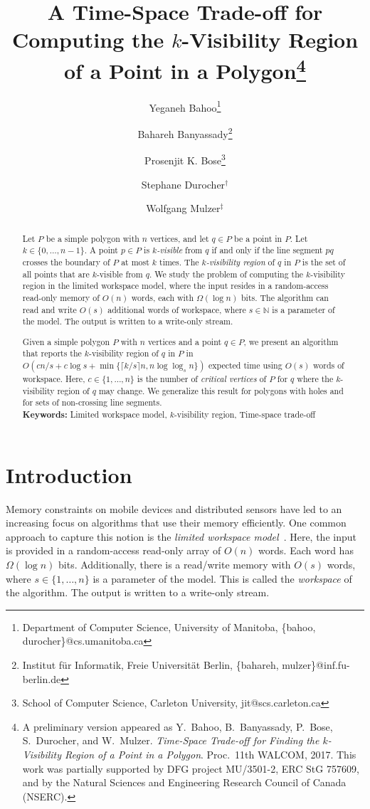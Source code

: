 \documentclass[11pt, a4paper]{article}
\title{A Time-Space Trade-off for Computing the $k$-Visibility 
Region of a Point in a Polygon\footnote{
A preliminary version appeared as 
Y.~Bahoo, B.~Banyassady, P.~Bose, S.~Durocher, and 
W.~Mulzer. \emph{Time-Space Trade-off for Finding 
the $k$-Visibility Region of a Point in a Polygon}. Proc.~11th WALCOM, 
2017.  This work was partially 
supported by DFG project MU/3501-2, ERC StG 757609, and by the 
Natural Sciences and Engineering Research Council of Canada (NSERC).}}
\author{Yeganeh Bahoo\thanks{Department of Computer Science,
        University of Manitoba, \{bahoo, durocher\}@cs.umanitoba.ca}
        \and
        Bahareh Banyassady\thanks{Institut f\"ur Informatik, Freie 
	Universit\"at Berlin,
        {\{bahareh, mulzer\}@inf.fu-berlin.de}}
        \and
        Prosenjit K. Bose\thanks{School of Computer Science,
        Carleton University, {jit@scs.carleton.ca}}
        \and 
        Stephane Durocher$^\dagger$
        \and 
        Wolfgang Mulzer$^\ddagger$
        }
\date{}
\newcommand{\N}{\mathbb{N}}
\begin{document}
\maketitle

\begin{abstract}
Let $P$ be a simple polygon with $n$ vertices, and let 
$q \in P$ be a point in $P$. Let $k \in \{0, \dots, n - 1\}$. 
A point $p \in P$ is \emph{$k$-visible} from $q$ 
if and only if the line segment $pq$ crosses the 
boundary of $P$ at most $k$ times. The \emph{$k$-visibility 
region} of $q$ in $P$ is the set of all points that 
are $k$-visible from $q$.  We study the problem of 
computing the $k$-visibility region in the 
limited workspace model, where the input resides 
in a random-access read-only memory of $O(n)$ words, 
each with $\Omega(\log{n})$ bits. The algorithm can read 
and write $O(s)$ additional words of workspace, 
where $s \in \N$ is a parameter of the model. The 
output is written to a write-only stream. 

Given a simple polygon $P$ with $n$ vertices and 
a point $q \in P$, we present an
algorithm that reports the $k$-visibility region 
of $q$ in $P$ in $O(cn/s+c\log{s} + 
\min\{\lceil k/s \rceil n,n \log{\log_s{n}}\})$ 
expected time using $O(s)$ words of workspace. 
Here, $c \in \{1, \dots, n\}$ is the number of 
\emph{critical vertices} of $P$ for $q$ where the 
$k$-visibility region of $q$ may change. We 
generalize this result for polygons with holes 
and for sets of non-crossing line segments.\\
\linebreak\textbf{Keywords:} Limited workspace model, 
$k$-visibility region, 
Time-space trade-off
\end{abstract}

\section{Introduction}
Memory constraints on mobile devices and 
distributed sensors have led to an increasing 
focus on algorithms that use their memory 
efficiently. One common approach to capture 
this notion is the \emph{limited workspace model}~\cite{asano2013memory}. 
Here, the input is provided in a random-access read-only 
array of $O(n)$ words. Each word has 
$\Omega(\log{n})$ bits. Additionally, there is a 
read/write memory with $O(s)$ words, where 
$s \in \{1, \dots, n \}$ is a parameter of the model. 
This is called the \emph{workspace} of the 
algorithm. The output is written to a write-only 
stream. 
\end{document}
